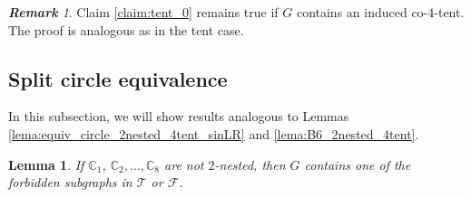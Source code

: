 \documentclass[12pt]{book}
\theoremstyle{plain}
\newtheorem{lema}[teo]{Lemma}
\theoremstyle{remark}
\newtheorem{remark}[teo]{\textbf{\textit{Remark}}}
\begin{document}
\begin{remark}
	Claim \ref{claim:tent_0} remains true if $G$ contains an induced co-$4$-tent.
	The proof is analogous as in the tent case.
\end{remark}


\subsection{Split circle equivalence} \label{subsec:co4tent2}

In this subsection, we will show results analogous to Lemmas \ref{lema:equiv_circle_2nested_4tent_sinLR} and \ref{lema:B6_2nested_4tent}.

\begin{lema} \label{lema:equiv_circle_2nested_co4tent}%
	If $\mathbb C_1$, $\mathbb C_2, \ldots, \mathbb C_8$ are not $2$-nested, then $G$ contains one of the forbidden subgraphs in $\mathcal{T}$ or $\mathcal{F}$. %
\end{lema}
\end{document}
